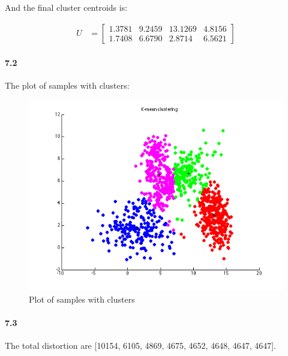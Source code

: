 \documentclass[a4paper]{article}
\begin{document}
	And the final cluster centroids is: 
	
	\begin{align}
		U &= \begin{bmatrix}
				1.3781  &  9.2459  & 13.1269  &  4.8156 \\ 
			    1.7408  &  6.6790  &  2.8714  &  6.5621
			\end{bmatrix}
	\end{align}

\paragraph{7.2} The plot of samples with clusters: \\

	\begin{figure}[H]
	  \centering
	    \includegraphics[scale=.57]{images/k_mean.png}
	  \caption{Plot of samples with clusters}
	\end{figure}

\paragraph{7.3} The total distortion are [10154,    6105,    4869,    4675,    4652,    4648,    4647,    4647]. \\
\end{document}
